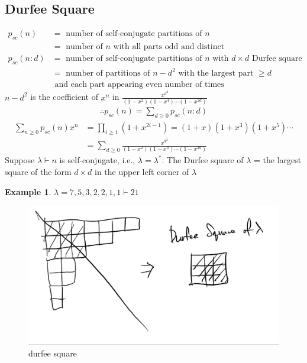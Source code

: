 \documentclass{article}
\theoremstyle{definition}
\newtheorem{ex}{Example}[]
\begin{document}
\subsection{Durfee Square}
\begin{align*}
    p_{sc}(n) &= \text{ number of self-conjugate partitions of }n \\ 
    &= \text{ number of }n \text{ with all parts odd and distinct} \\ 
    p_{sc}(n : d) &= \text{ number of self-conjugate partitions of } n 
    \text{ with } d\times d \text{ Durfee square}  \\ 
    &= \text{ number of partitions of } n -d^2 \text{ with the largest
    part } \ge d 
    \\ &\text{ and each part appearing even number of times}
\end{align*}
$n-d^2$ is the coefficient of $x^n$ in $\frac{x^{d^2}}{(1-x^2)(1-x^4) \cdots (1-x^{2d})}$
\begin{align*}
    \therefore p_{sc}(n) = \sum_{d\ge 0} p_{sc}(n : d)
\end{align*}
\begin{align*}
    \sum_{n\ge 0} p_{sc}(n) x^n &= \prod_{i \ge 1} \left( 1+ x^{2i - 1}\right) 
    = (1+x) (1+x^3) ( 1+x^5)  \cdots \\ 
    &= \sum_{d \ge 0} \frac{x^{d^2}}{(1-x^2)(1-x^4) \cdots (1-x^{2d})}
\end{align*}
Suppose $\lambda \vdash n$ is self-conjugate, i.e., $\lambda = \lambda^*$.
The Durfee square of $\lambda$ = the largest square of the form $d \times d$
in the upper left corner of $\lambda$
\begin{ex}
    $\lambda = 7,5,3,2,2,1,1 \vdash 21$
    \begin{figure}[!h]
        \centerline{\includegraphics[width=0.5\columnwidth]{durfee_square.jpg}}
        \caption{durfee square}
        \label{durfee square} 
    \end{figure}
\end{ex}
\end{document}
